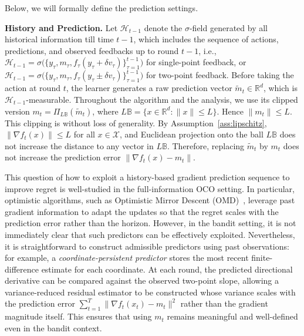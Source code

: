 \documentclass[journal,onecolumn]{IEEEtran}
\newcommand{\cH}{\mathcal{H}}
\theoremstyle{plain}
\theoremstyle{definition}
\theoremstyle{remark}
\begin{document}

Below, we will formally define the prediction settings.

\textbf{History and Prediction.}
Let $\cH_{t-1}$ denote the $\sigma$-field generated by all historical information till
time $t-1$, which includes the sequence of actions, predictions, and observed feedbacks up to round $t-1$, i.e., $\mathcal{H}_{t-1} = \sigma\big(\{y_{\tau}, m_{\tau}, f_{\tau}(y_{\tau}\!+\!\delta v_{\tau})\}_{\tau=1}^{t-1}\big)$ for single-point feedback, or $\mathcal{H}_{t-1} = \sigma\big(\{y_{\tau}, m_{\tau}, f_{\tau}(y_{\tau} \pm \delta v_{\tau})\}_{\tau=1}^{t-1}\big)$ for two-point feedback. Before taking the action at round $t$, the learner generates a raw prediction
vector $\widetilde m_t\in\mathbb R^d$, which is $\mathcal H_{t-1}$-measurable.
Throughout the algorithm and the analysis, we use its clipped version $m_t = \Pi_{L\mathbb B}(\widetilde m_t)$, where $L\mathbb B=\{x\in\mathbb R^d:\|x\|\le L\}$. Hence $\|m_t\|\le L$.
This clipping is without loss of generality. By Assumption~\ref{ass:lipschitz},
$\|\nabla f_t(x)\|\le L$ for all $x\in\mathcal X$, and Euclidean projection onto
the ball $L\mathbb B$ does not increase the distance to any vector in $L\mathbb B$.
Therefore, replacing $\widetilde m_t$ by $m_t$ does not increase the prediction
error $\|\nabla f_t(x)-m_t\|$.



This question of how to exploit a history-based gradient prediction sequence to improve regret is well-studied in the full-information OCO setting. 
In particular, optimistic algorithms, such as Optimistic Mirror Descent (OMD)~\cite{rakhlin2013online}, leverage past gradient information to adapt the updates so that the regret scales with the prediction error rather than the horizon. However, in the bandit setting, it is not immediately clear that such predictors can be effectively exploited.
Nevertheless, it is straightforward to construct admissible predictors using past observations: for example, a \emph{coordinate-persistent predictor} stores the most recent finite-difference estimate for each coordinate. 
At each round, the predicted directional derivative can be compared against the observed two-point slope, allowing a variance-reduced residual estimator to be constructed whose variance scales with the prediction error $\sum_{t=1}^T \|\nabla f_t(x_t)-m_t\|^2$ rather than the gradient magnitude itself. 
This ensures that using $m_t$ remains meaningful and well-defined even in the bandit context.
\end{document}
